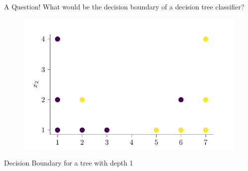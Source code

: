 \documentclass{beamer}
\begin{document}
	\begin{frame}{A Question!}
What would be the decision boundary of a decision tree classifier? 

\begin{figure}
	\centering
	\includegraphics{../figures/decision-trees/bias-variance-dataset.pdf}
\end{figure}


\end{frame}

\begin{frame}{Decision Boundary for a tree with depth 1}
\begin{figure}%
\centering
{}%
\qquad
{}%
\label{fig:example}%
\end{figure}
\end{frame}
\end{document}
